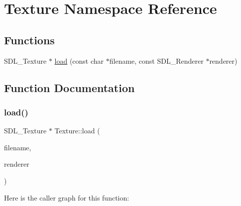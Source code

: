 \hypertarget{namespace_texture}{}\section{Texture Namespace Reference}
\label{namespace_texture}
\subsection*{Functions}
\begin{DoxyCompactItemize}
\item 
S\+D\+L\+\_\+\+Texture $\ast$ \mbox{\hyperlink{namespace_texture_a10ebaa6812403924382db04511028781}{load}} (const char $\ast$filename, const S\+D\+L\+\_\+\+Renderer $\ast$renderer)
\end{DoxyCompactItemize}


\subsection{Function Documentation}
\mbox{\label{namespace_texture_a10ebaa6812403924382db04511028781}} 
\subsubsection{\texorpdfstring{load()}{load()}}
{\footnotesize\ttfamily S\+D\+L\+\_\+\+Texture $\ast$ Texture\+::load (\begin{DoxyParamCaption}\item[{const char $\ast$}]{filename,  }\item[{const S\+D\+L\+\_\+\+Renderer $\ast$}]{renderer }\end{DoxyParamCaption})}

Here is the caller graph for this function\+:
